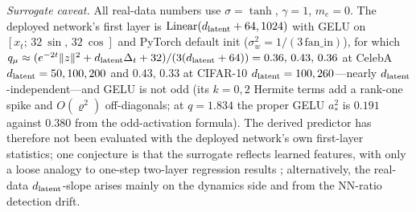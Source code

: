 \emph{Surrogate caveat.} All real-data numbers use $\sigma=\tanh$, $\gamma=1$, $m_e=0$. The deployed network's first layer is $\mathrm{Linear}(d_{\mathrm{latent}}+64,1024)$ with GELU on $[x_t;\,32\ \sin,\,32\ \cos]$ and PyTorch default init ($\sigma_w^2=1/(3\,\mathrm{fan\_in})$), for which $q_\mu\approx(e^{-2t}\|z\|^2+d_{\mathrm{latent}}\Delta_t+32)/(3(d_{\mathrm{latent}}+64))=0.36,\,0.43,\,0.36$ at CelebA $d_{\mathrm{latent}}=50,100,200$ and $0.43,\,0.33$ at CIFAR-10 $d_{\mathrm{latent}}=100,260$---nearly $d_{\mathrm{latent}}$-independent---and GELU is not odd (its $k=0,2$ Hermite terms add a rank-one spike and $O(\varrho^2)$ off-diagonals; at $q=1.834$ the proper GELU $a_*^2$ is $0.191$ against $0.380$ from the odd-activation formula). The derived predictor has therefore not been evaluated with the deployed network's own first-layer statistics; one conjecture is that the surrogate reflects learned features, with only a loose analogy to one-step two-layer regression results \citep{ba2022highdimensional}; alternatively, the real-data $d_{\mathrm{latent}}$-slope arises mainly on the dynamics side and from the NN-ratio detection drift.

